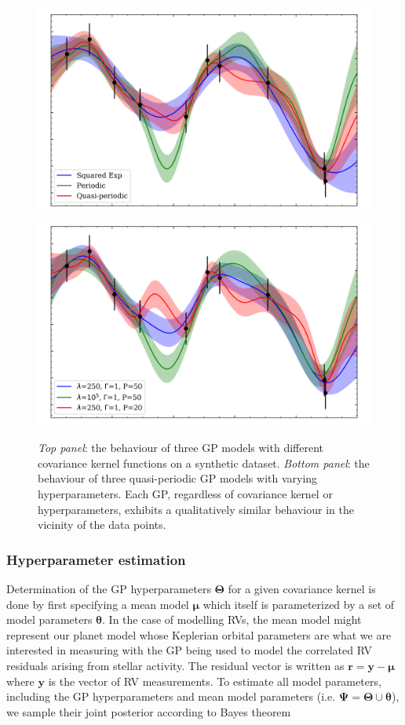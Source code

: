 \begin{figure}
  \centering
  \includegraphics[width=0.8\hsize]{figures/gpkernels.png}
  \includegraphics[width=0.8\hsize]{figures/gpkernelvalues.png}
  \caption[Behaviour of GPs with different covariance kernels and hyperparameters.]
          {\emph{Top panel}: the behaviour of three GP models with different covariance
            kernel functions on a synthetic dataset. \emph{Bottom panel}: the behaviour of three
            quasi-periodic GP models with varying hyperparameters. Each GP, regardless of
            covariance kernel or hyperparameters, exhibits
            a qualitatively similar behaviour in the vicinity of the data points.}
          \label{fig:exactgp}
\end{figure}


\subsubsection{Hyperparameter estimation}
Determination of the GP hyperparameters $\boldsymbol{\Theta}$ for a given covariance kernel is
done by first specifying a mean model $\boldsymbol{\mu}$ which itself is parameterized by
a set of model parameters $\boldsymbol{\theta}$. In the case of modelling RVs, the mean model
might represent our planet model whose Keplerian orbital parameters are what we are interested
in measuring with the GP being used to model the correlated RV residuals arising from stellar
activity. The residual vector is written as $\mathbf{r} = \mathbf{y} - \boldsymbol{\mu}$
where $\mathbf{y}$ is the vector of \nrv{} RV measurements. 
To estimate all model parameters, including the GP hyperparameters and mean model
parameters (i.e. $\boldsymbol{\Psi} = \boldsymbol{\Theta} \cup \boldsymbol{\theta}$),
we sample their joint posterior according to Bayes theorem

